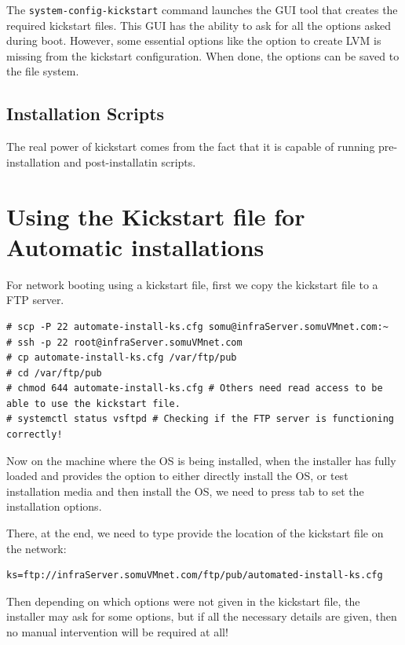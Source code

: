 The \verb|system-config-kickstart| command launches the GUI tool that creates the required kickstart files. This GUI has the ability to ask for all the options asked during boot. However, some essential options like the option to create LVM is missing from the kickstart configuration. When done, the options can be saved to the file system. 

\subsection{Installation Scripts}
The real power of kickstart comes from the fact that it is capable of running pre-installation and post-installatin scripts. 

	\section{Using the Kickstart file for Automatic installations}
For network booting using a kickstart file, first we copy the kickstart file to a FTP server.

\vspace{-15pt}
\begin{verbatim}
# scp -P 22 automate-install-ks.cfg somu@infraServer.somuVMnet.com:~
# ssh -p 22 root@infraServer.somuVMnet.com
# cp automate-install-ks.cfg /var/ftp/pub
# cd /var/ftp/pub
# chmod 644 automate-install-ks.cfg # Others need read access to be able to use the kickstart file. 
# systemctl status vsftpd # Checking if the FTP server is functioning correctly!
\end{verbatim}
\vspace{-10pt}

Now on the machine where the OS is being installed, when the installer has fully loaded and provides the option to either directly install the OS, or test installation media and then install the OS, we need to press tab to set the installation options. 

There, at the end, we need to type provide the location of the kickstart file on the network:

\vspace{-15pt}
\begin{verbatim}
ks=ftp://infraServer.somuVMnet.com/ftp/pub/automated-install-ks.cfg
\end{verbatim}
\vspace{-10pt}

\noindent
Then depending on which options were not given in the kickstart file, the installer may ask for some options, but if all the necessary details are given, then no manual intervention will be required at all!

